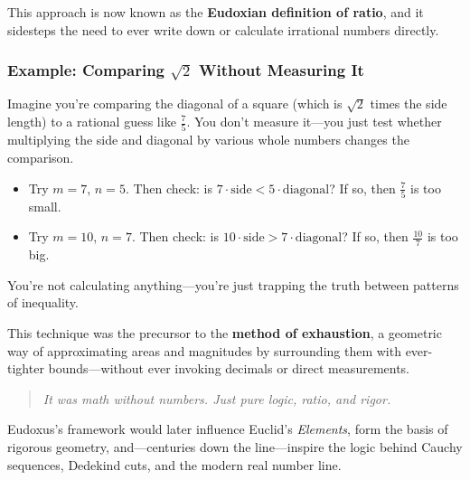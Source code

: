 \medskip

\noindent This approach is now known as the \textbf{Eudoxian definition of ratio}, and it sidesteps the need to ever write down or calculate irrational numbers directly.

\subsubsection*{Example: Comparing \( \sqrt{2} \) Without Measuring It}

Imagine you're comparing the diagonal of a square (which is \( \sqrt{2} \) times the side length) to a rational guess like \( \frac{7}{5} \). You don't measure it—you just test whether multiplying the side and diagonal by various whole numbers changes the comparison.

\begin{itemize}
    \item Try \( m = 7 \), \( n = 5 \). Then check: is \( 7 \cdot \text{side} < 5 \cdot \text{diagonal} \)? If so, then \( \frac{7}{5} \) is too small.
    \item Try \( m = 10 \), \( n = 7 \). Then check: is \( 10 \cdot \text{side} > 7 \cdot \text{diagonal} \)? If so, then \( \frac{10}{7} \) is too big.
\end{itemize}

\noindent You’re not calculating anything—you’re just trapping the truth between patterns of inequality.

\medskip

\noindent This technique was the precursor to the \textbf{method of exhaustion}, a geometric way of approximating areas and magnitudes by surrounding them with ever-tighter bounds—without ever invoking decimals or direct measurements.

\begin{quote}
\textit{It was math without numbers. Just pure logic, ratio, and rigor.}
\end{quote}

\noindent Eudoxus’s framework would later influence Euclid’s \textit{Elements}, form the basis of rigorous geometry, and—centuries down the line—inspire the logic behind Cauchy sequences, Dedekind cuts, and the modern real number line.

